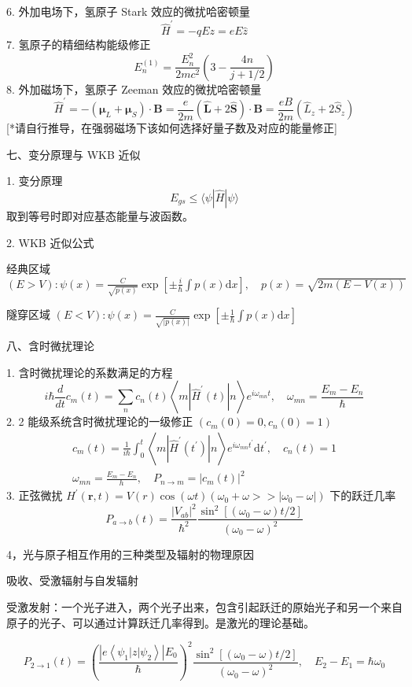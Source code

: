 \documentclass[../../note.tex]{subfiles}
\begin{document}
6. 外加电场下，氢原子 Stark 效应的微扰哈密顿量
$$
\hat{H}^{\prime}=-q E z=e E \hat{z}
$$
7. 氢原子的精细结构能级修正
$$
E_n^{(1)}=\frac{E_n^2}{2 m c^2}\left(3-\frac{4 n}{j+1 / 2}\right)
$$
8. 外加磁场下，氢原子 Zeeman 效应的微扰哈密顿量
$$
\hat{H}^{\prime}=-\left(\boldsymbol{\mu}_L+\boldsymbol{\mu}_S\right) \cdot \boldsymbol{B}=\frac{e}{2 m}(\hat{\boldsymbol{L}}+2 \hat{\boldsymbol{S}}) \cdot \boldsymbol{B}=\frac{e B}{2 m}\left(\hat{L}_z+2 \hat{S}_z\right)
$$
[*请自行推导，在强弱磁场下该如何选择好量子数及对应的能量修正]

七、变分原理与 WKB 近似

1. 变分原理
$$
E_{g s} \leq\langle\psi|\hat{H}| \psi\rangle
$$
取到等号时即对应基态能量与波函数。

2. WKB 近似公式

经典区域 $(E>V): \psi(x)=\frac{C}{\sqrt{p(x)}} \exp \left[ \pm \frac{i}{\hbar} \int p(x) \mathrm{d} x\right], \quad p(x)=\sqrt{2 m(E-V(x))}$

隧穿区域 $(E<V): \psi(x)=\frac{C}{\sqrt{|p(x)|}} \exp \left[ \pm \frac{1}{\hbar} \int p(x) \mathrm{d} x\right]$

八、含时微扰理论

1. 含时微扰理论的系数满足的方程
$$
i \hbar \frac{d}{d t} c_m(t)=\sum_n c_n(t)\left\langle m\left|\hat{H}^{\prime}(t)\right| n\right\rangle e^{i \omega_{m n} t}, \quad \omega_{m n}=\frac{E_m-E_n}{\hbar}
$$
2. 2 能级系统含时微扰理论的一级修正 $\left(c_m(0)=0, c_n(0)=1\right)$
$$
\begin{array}{r}
c_m(t)=\frac{1}{i \hbar} \int_0^t\left\langle m\left|\hat{H}^{\prime}\left(t^{\prime}\right)\right| n\right\rangle e^{i \omega_{m n} t^{\prime}} \mathrm{d} t^{\prime}, \quad c_n(t)=1 \\
\omega_{m n}=\frac{E_m-E_n}{h}, \quad P_{n \rightarrow m}=\left|c_m(t)\right|^2
\end{array}
$$
3. 正弦微扰 $H^{\prime}(\boldsymbol{r}, t)=V(r) \cos (\omega t)\left(\omega_0+\omega>>\left|\omega_0-\omega\right|\right)$ 下的跃迁几率
$$
P_{a \rightarrow b}(t)=\frac{\left|V_{a b}\right|^2}{\hbar^2} \frac{\sin ^2\left[\left(\omega_0-\omega\right) t / 2\right]}{\left(\omega_0-\omega\right)^2}
$$

4，光与原子相互作用的三种类型及辐射的物理原因

吸收、受激辐射与自发辐射

受激发射：一个光子进入，两个光子出来，包含引起跃迁的原始光子和另一个来自原子的光子、可以通过计算跃迁几率得到。是激光的理论基础。

$$
P_{2 \rightarrow 1}(t)=\left(\frac{\left|e\left\langle\psi_1|z| \psi_2\right\rangle\right| E_0}{\hbar}\right)^2 \frac{\sin ^2\left[\left(\omega_0-\omega\right) t / 2\right]}{\left(\omega_0-\omega\right)^2}, \quad E_2-E_1=\hbar \omega_0 
$$
\end{document}
